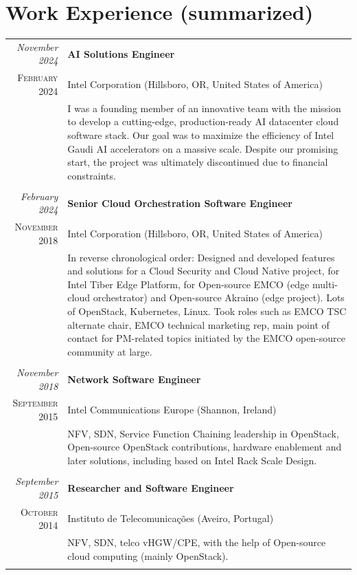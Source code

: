 \documentclass[letter,10pt]{article} %
\begin{document}
\section{Work Experience (summarized)}
\label{section:work_experience_summarized}
\begin{tabular}{r|p{13.4cm}}
	\emph{November 2024} & \textbf{AI Solutions Engineer} \\
	\textsc{February 2024} & Intel Corporation (Hillsboro, OR, United States of America) \\
	& \footnotesize{I was a founding member of an innovative team with the mission to develop a cutting-edge, production-ready AI datacenter cloud software stack. Our goal was to maximize the efficiency of Intel Gaudi AI accelerators on a massive scale. Despite our promising start, the project was ultimately discontinued due to financial constraints.}\\
	\multicolumn{2}{c}{} \\
	
	\emph{February 2024} & \textbf{Senior Cloud Orchestration Software Engineer }\\
	\textsc{November 2018} & Intel Corporation (Hillsboro, OR, United States of America) \\
	& \footnotesize{In reverse chronological order: Designed and developed features and solutions for a Cloud Security and Cloud Native project, for Intel Tiber Edge Platform, for Open-source EMCO (edge multi-cloud orchestrator) and Open-source Akraino (edge project). Lots of OpenStack, Kubernetes, Linux. Took roles such as EMCO TSC alternate chair, EMCO technical marketing rep, main point of contact for PM-related topics initiated by the EMCO open-source community at large.}\\
	\multicolumn{2}{c}{} \\
	
	\emph{November 2018} & \textbf{Network Software Engineer} \\
	\textsc{September 2015} & Intel Communications Europe (Shannon, Ireland) \\
	& \footnotesize{NFV, SDN, Service Function Chaining leadership in OpenStack, Open-source OpenStack contributions, hardware enablement and later solutions, including based on Intel Rack Scale Design.}\\
	\multicolumn{2}{c}{} \\
	
	\emph{September 2015} & \textbf{Researcher and Software Engineer} \\
	\textsc{October 2014} & Instituto de Telecomunicações (Aveiro, Portugal) \\
	& \footnotesize{NFV, SDN, telco vHGW/CPE, with the help of Open-source cloud computing (mainly OpenStack).}\\
	\multicolumn{2}{c}{} \\
	

\end{tabular}
\end{document}
